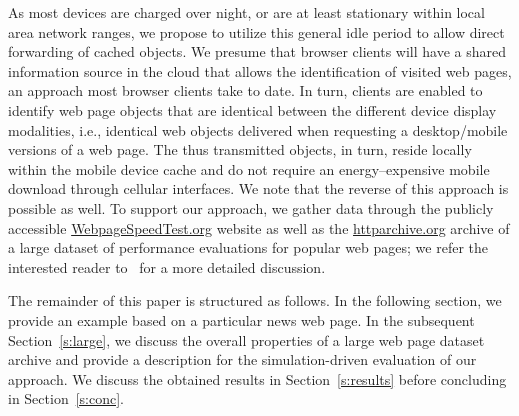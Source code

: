 \documentclass[letterpaper,conference]{IEEEtran}
\begin{document}
As most devices are charged over night, or are at least stationary within local area network ranges, we propose to utilize this general idle period to allow direct forwarding of cached objects.
We presume that browser clients will have a shared information source in the cloud that allows the identification of visited web pages, an approach most browser clients take to date.
In turn, clients are enabled to identify web page objects that are identical between the different device display modalities, i.e., identical web objects delivered when requesting a desktop/mobile versions of a web page.
The thus transmitted objects, in turn, reside locally within the mobile device cache and do not require an energy--expensive mobile download through cellular interfaces. 
We note that the reverse of this approach is possible as well.
To support our approach, we gather data through the publicly accessible \url{WebpageSpeedTest.org} website as well as the \url{httparchive.org} archive of a large dataset of performance evaluations for popular web pages; we refer the interested reader to~\cite{Me13} for a more detailed discussion.

The remainder of this paper is structured as follows.
In the following section, %
we provide an example based on a particular news web page.
In the subsequent Section~\ref{s:large}, we discuss the overall properties of a large web page dataset archive and provide a description for the simulation-driven evaluation of our approach. 
We discuss the obtained results in Section~\ref{s:results} before concluding in Section~\ref{s:conc}.


\end{document}
